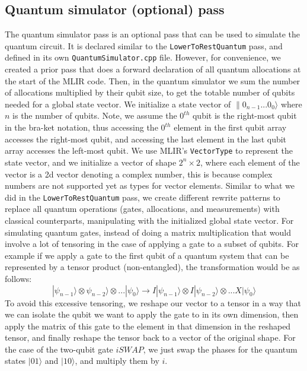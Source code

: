 \subsection{Quantum simulator (optional) pass}
The quantum simulator pass is an optional pass that can be used to simulate the
quantum circuit. It is declared similar to the \texttt{LowerToRestQuantum} pass, and
defined in its own \texttt{QuantumSimulator.cpp} file.
However, for convenience, we created a prior pass that does a forward
declaration of all quantum allocations at the start of the MLIR code.
Then, in the quantum simulator we sum the number of allocations multiplied by their qubit size,
to get the totable number of qubits needed for a global state vector.
We initialize a state vector of $\|0_{n-1}...0_0\rangle$ where $n$ is the number of qubits.
Note, we assume the $0^{th}$ qubit is the right-most qubit in the bra-ket notation, thus
accessing the $0^{th}$ element in the first qubit array accesses the right-most qubit, and accessing
the last element in the last qubit array accesses the left-most qubit.
We use MLIR's \texttt{VectorType} to represent the state vector,
and we initialize a vector of shape $2^n \times 2$, where each element
of the vector is a 2d vector denoting a complex number, this is because
complex numbers are not supported yet as types for vector elements.
Similar to what we did in the \texttt{LowerToRestQuantum} pass, we create different
rewrite patterns to replace all quantum operations (gates, allocations, and measurements)
with classical counterparts, manipulating with the initialized global
state vector. For simulating quantum gates, instead of
doing a matrix multiplication that would
involve a lot of tensoring in the case of applying a gate to a subset of qubits.
For example if we apply a gate to the first qubit of a quantum system that can be represented by a
tensor product (non-entangled), the transformation would be as follows:
\begin{equation}
    |\psi_{n-1}\rangle \otimes \psi_{n-2}\rangle  \otimes ... |\psi_0\rangle
    \rightarrow
    I  |\psi_{n-1}\rangle \otimes I  |\psi_{n-2}\rangle  \otimes ... X  |\psi_0\rangle
\end{equation}
To avoid this excessive tensoring, we reshape our vector to a tensor in a way that we can
isolate the qubit we want to apply the gate to in its own dimension, then apply the matrix of this gate
to the element in that dimension in the reshaped tensor,
and finally reshape the tensor back to a vector of the original shape.
For the case of the two-qubit gate $iSWAP$, we just swap the phases for the 
quantum states $|01\rangle$ and $|10\rangle$, and multiply them by $i$.

